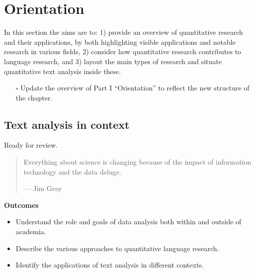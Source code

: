 \documentclass[
  letterpaper,
  DIV=11,
  numbers=noendperiod]{scrreport}
\providecommand{\tightlist}{%
  \setlength{\itemsep}{0pt}\setlength{\parskip}{0pt}}\usepackage{longtable,booktabs,array}
\theoremstyle{definition}
\theoremstyle{remark}
\begin{document}
\part{Orientation}

In this section the aims are to: 1) provide an overview of quantitative
research and their applications, by both highlighting visible
applications and notable research in various fields, 2) consider how
quantitative research contributes to language research, and 3) layout
the main types of research and situate quantitative text analysis inside
these.

\begin{itemize}
\tightlist
\item[$\square$]
   Update the overview of Part I ``Orientation'' to
  reflect the new structure of the chapter.
\end{itemize}

\hypertarget{sec-text-analysis-in-context}{%
\chapter{Text analysis in context}\label{sec-text-analysis-in-context}}

\begin{tcolorbox}[enhanced jigsaw, coltitle=black, breakable, colbacktitle=quarto-callout-tip-color!10!white, title=\textcolor{quarto-callout-tip-color}{\faLightbulb}\hspace{0.5em}{Draft}, leftrule=.75mm, bottomrule=.15mm, arc=.35mm, left=2mm, colback=white, toptitle=1mm, colframe=quarto-callout-tip-color-frame, bottomtitle=1mm, toprule=.15mm, rightrule=.15mm, titlerule=0mm, opacitybacktitle=0.6, opacityback=0]

Ready for review.

\end{tcolorbox}

\begin{quote}
Everything about science is changing because of the impact of
information technology and the data deluge.

--- Jim Gray
\end{quote}

\begin{tcolorbox}[enhanced jigsaw, leftrule=.75mm, bottomrule=.15mm, opacityback=0, breakable, left=2mm, colback=white, toprule=.15mm, arc=.35mm, rightrule=.15mm]

\textbf{ Outcomes}

\begin{itemize}
\tightlist
\item
  Understand the role and goals of data analysis both within and outside
  of academia.
\item
  Describe the various approaches to quantitative language research.
\item
  Identify the applications of text analysis in different contexts.
\end{itemize}

\end{tcolorbox}
\end{document}
